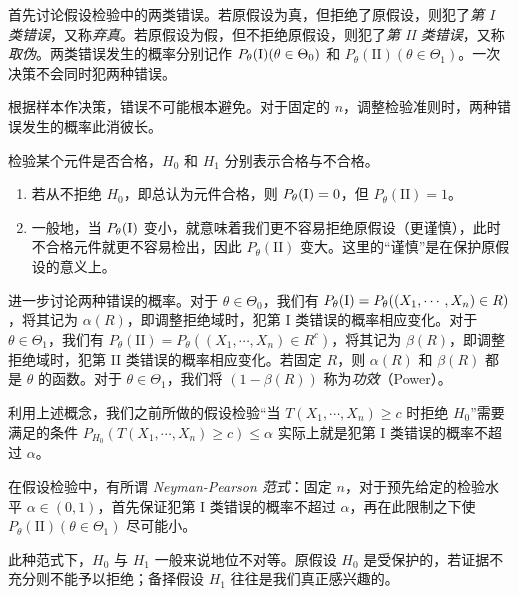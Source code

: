 \documentclass[../main.tex]{subfiles}
\begin{document}
首先讨论假设检验中的两类错误。若原假设为真，但拒绝了原假设，则犯了\emph{第 I 类错误}，又称\emph{弃真}。若原假设为假，但不拒绝原假设，则犯了\emph{第 II 类错误}，又称\emph{取伪}。两类错误发生的概率分别记作 $P_\theta(\text I)(\theta\in\Theta_0)$ 和 $P_\theta(\text{II})(\theta\in\Theta_1)$。一次决策不会同时犯两种错误。

根据样本作决策，错误不可能根本避免。对于固定的 $n$，调整检验准则时，两种错误发生的概率此消彼长。

\begin{example}
    检验某个元件是否合格，$H_0$ 和 $H_1$ 分别表示合格与不合格。
    \begin{enumerate}
        \item 若从不拒绝 $H_0$，即总认为元件合格，则 $P_\theta(\text I)=0$，但 $P_\theta(\text{II})=1$。
        \item 一般地，当 $P_\theta(\text I)$ 变小，就意味着我们更不容易拒绝原假设（更谨慎），此时不合格元件就更不容易检出，因此 $P_\theta(\text{II})$ 变大。这里的“谨慎”是在保护原假设的意义上。
    \end{enumerate}
\end{example}

进一步讨论两种错误的概率。对于 $\theta\in\Theta_0$，我们有 $P_\theta(\text I)=P_\theta((X_1,\cdots,X_n)\in R)$，将其记为 $\alpha(R)$，即调整拒绝域时，犯第 I 类错误的概率相应变化。对于 $\theta\in\Theta_1$，我们有 $P_\theta(\text{II})=P_\theta((X_1,\cdots,X_n)\in R^c)$，将其记为 $\beta(R)$，即调整拒绝域时，犯第 II 类错误的概率相应变化。若固定 $R$，则 $\alpha(R)$ 和 $\beta(R)$ 都是 $\theta$ 的函数。对于 $\theta\in\Theta_1$，我们将 $(1-\beta(R))$ 称为\emph{功效}（Power）。

利用上述概念，我们之前所做的假设检验“当 $T(X_1,\cdots,X_n)\geq c$ 时拒绝 $H_0$”需要满足的条件 $P_{H_0}(T(X_1,\cdots,X_n)\geq c)\leq\alpha$ 实际上就是犯第 I 类错误的概率不超过 $\alpha$。

在假设检验中，有所谓 \emph{Neyman-Pearson 范式}：固定 $n$，对于预先给定的检验水平 $\alpha\in(0,1)$，首先保证犯第 I 类错误的概率不超过 $\alpha$，再在此限制之下使 $P_\theta(\text{II})(\theta\in\Theta_1)$ 尽可能小。

此种范式下，$H_0$ 与 $H_1$ 一般来说地位不对等。原假设 $H_0$ 是受保护的，若证据不充分则不能予以拒绝；备择假设 $H_1$ 往往是我们真正感兴趣的。
\end{document}

